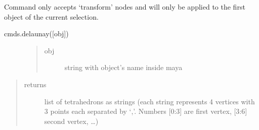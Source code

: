 \documentclass[letterpaper,10pt,english]{sphinxmanual}
\begin{document}
Command only accepts ‘transform’ nodes and will only be applied to the first object of the current selection.

 cmds.delaunay({[}obj{]})
\begin{description}
\item[{}] \leavevmode\begin{quote}\begin{description}
\item[{obj}] \leavevmode
string with object’s name inside maya

\end{description}\end{quote}

\end{description}
\begin{quote}\begin{description}
\item[{returns}] \leavevmode
list of tetrahedrons as strings (each string represents 4 vertices with 3 points each separated by ‘,’. Numbers {[}0:3{]} are first vertex, {[}3:6{]} second vertex, …)

\end{description}\end{quote}
\begin{description}
\item[{}] \leavevmode
\begin{sphinxVerbatim}[commandchars=\\\{\}]
\end{sphinxVerbatim}

\end{description}
\end{document}
